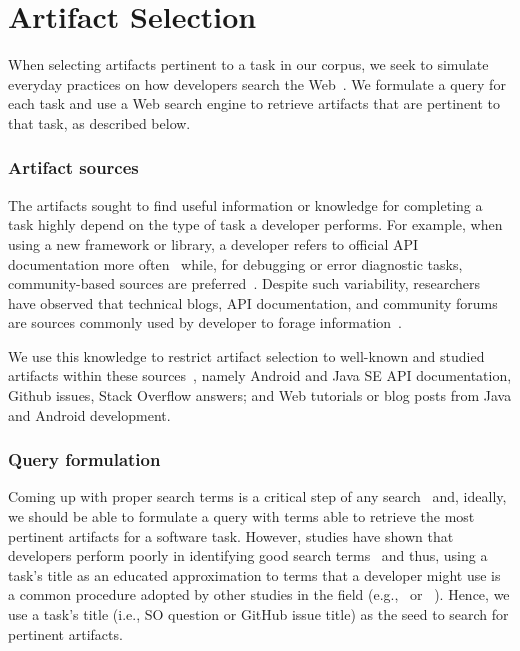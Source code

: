 
\section{Artifact Selection}
\label{cp4:corpus-artifacts}


When selecting artifacts pertinent to a task in our corpus, we seek to simulate everyday practices on how developers search the Web~\cite{rao2020, Xia2017}.
We formulate a query for each task and use a Web search engine to retrieve artifacts that are pertinent to that task, as described below.


\subsubsection{Artifact sources}



The artifacts sought to find useful information or knowledge for completing a task
highly depend on the type of task a developer performs.
For example, when using a new framework or library, a developer refers to official API documentation more often~\cite{Li2013,robillard2011field} while, for debugging or error diagnostic tasks, community-based sources are preferred~\cite{Li2013,Breu2010}.
Despite such variability, researchers have observed that 
technical blogs, API documentation, and community forums are sources
commonly used by developer to forage information~\cite{Li2013, josyula2018}.



We use this knowledge to restrict artifact selection to well-known and studied artifacts within these sources~\cite{Starke2009,Kevic2014, Li2013}, namely
Android and Java SE API documentation, Github issues, Stack Overflow answers; and Web tutorials or blog posts from Java and Android development.





\subsubsection{Query formulation}




Coming up with proper search terms is a critical step of any search~\cite{Haiduc2013}
and, ideally, we should be able to formulate a query with terms able to retrieve the most pertinent artifacts for a software task.
However, studies have shown that developers perform poorly in identifying good search terms~\cite{Starke2009,Kevic2014} and thus, using a task's title
as an educated approximation to terms that a developer might use is a common procedure adopted by other studies in the field (e.g.,~\cite{Xu2017} or ~\cite{Silva2019}).
Hence, we use a task's title (i.e., SO question or GitHub issue title) as the seed to search for pertinent artifacts.



